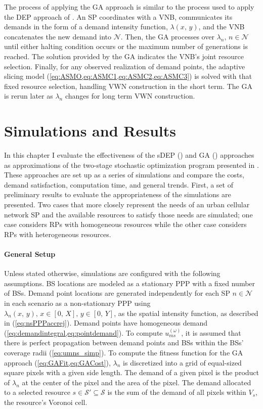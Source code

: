 \documentclass[12pt,dvipsnames]{report}
\begin{document}
The process of applying the GA approach is similar to the process used to apply the DEP approach of .  An SP coordinates with a VNB, communicates its demands in the form of a demand intensity function, $\lambda \left( x,\, y \right)$, and the VNB concatenates the new demand into $\mathcal{N}$.  Then, the GA processes over $\lambda_n,\, n \in \mathcal{N}$ until either halting condition occurs or the maximum number of generations is reached.  The solution provided by the GA indicates the VNB's joint resource selection.  Finally, for any observed realization of demand points, the adaptive slicing model (\cref{eq:ASMO,eq:ASMC1,eq:ASMC2,eq:ASMC3}) is solved with that fixed resource selection, handling VWN construction in the short term.  The GA is rerun later as $\lambda_n$ changes for long term VWN construction.
\fi

\iftrue
\pagebreak
\chapter{Simulations and Results} \label{ch:sim}

In this chapter I evaluate the effectiveness of the sDEP () and GA () approaches as approximations of the two-stage stochastic optimization program presented in .  These approaches are set up as a series of simulations and compare the costs, demand satisfaction, computation time, and general trends.  First, a set of preliminary results to evaluate the appropriateness of the simulations are presented.  Two cases that more closely represent the needs of an urban cellular network SP and the available resources to satisfy those needs are simulated; one case considers RPs with homogeneous resources while the other case considers RPs with heterogeneous resources.

\subsubsection{General Setup}

Unless stated otherwise, simulations are configured with the following assumptions.  BS locations are modeled as a stationary PPP with a fixed number of BSs.  Demand point locations are generated independently for each SP $n \in \mathcal{N}$ in each scenario as a non-stationary PPP using $\lambda_n\left( x,\, y \right),\, x \in \left[ 0,\, X \right],\, y \in \left[ 0,\, Y \right]$, as the spatial intensity function, as described in  (\cref{eq:nsPPPaccrej}).  Demand points have homogeneous demand (\cref{eq:demandintegral,eq:pointdemand}).  To compute $u_{ms}^{\left( \omega \right)}$, it is assumed that there is perfect propagation between demand points and BSs within the BSs' coverage radii (\cref{eq:umns_simp}).  To compute the fitness function for the GA approach (\cref{eq:GAFit,eq:GACost}), $\lambda_n$ is discretized into a grid of equal-sized square pixels with a given side length.  The demand of a given pixel is the product of $\lambda_n$ at the center of the pixel and the area of the pixel.  The demand allocated to a selected resource $s \in \mathcal{S}' \subseteq \mathcal{S}$ is the sum of the demand of all pixels within $V_s$, the resource's Voronoi cell.
\end{document}
